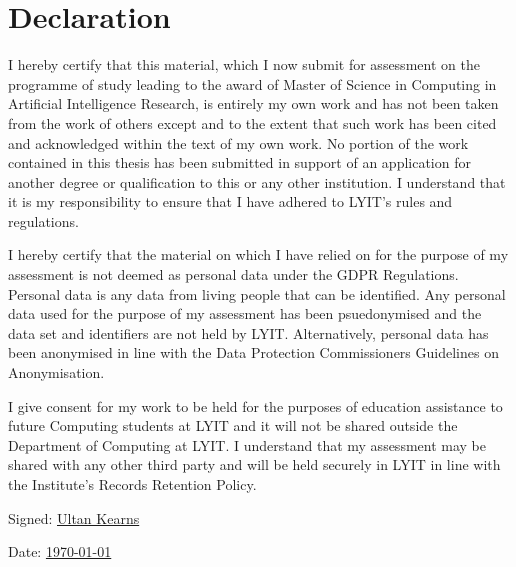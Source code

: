\documentclass[a4paper,11pt]{report}
\begin{document}
\chapter*{Declaration}

I hereby certify that this material, which I now submit for assessment on the programme of study leading to the award of Master of Science in Computing in Artificial Intelligence Research, is entirely my own work and has not been taken from the work of others except and to the extent that such work has been cited and acknowledged within the text of my own work. No portion of the work contained in this thesis has been submitted in support of an application for another degree or qualification to this or any other institution. I understand that it is my responsibility to ensure that I have adhered to LYIT’s rules and regulations.
\bigskip

I hereby certify that the material on which I have relied on for the purpose of my assessment is not deemed as personal data under the GDPR Regulations. Personal data is any data from living people that can be identified. Any personal data used for the purpose of my assessment has been psuedonymised and the data set and identifiers are not held by LYIT. Alternatively, personal data has been anonymised in line with the Data Protection Commissioners Guidelines on Anonymisation.
\bigskip

I give consent for my work to be held for the purposes of education assistance to future Computing students at LYIT and it will not be shared outside the Department of Computing at LYIT. I understand that my assessment may be shared with any other third party and will be held securely in LYIT in line with the Institute's Records Retention Policy. 

\vspace{20pt}

\hspace{60pt} Signed: \underline{\quad \quad Ultan Kearns\hspace{240pt}} 


\bigskip

\hspace{70pt} Date: \underline{\quad \quad\today\hspace{150pt}} 


\listoffigures
\listoftables






\printbibliography
\end{document}
